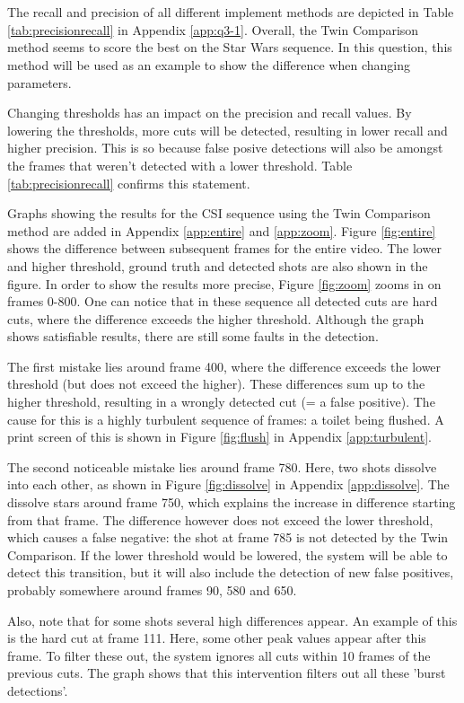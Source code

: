 \section[A comparative discussion of the precision and recall values obtained for each video shot detection method, taking into account different parameter settings.]{}
The recall and precision of all different implement methods are depicted in Table \ref{tab:precisionrecall} in Appendix \ref{app:q3-1}. Overall, the Twin Comparison method seems to score the best on the Star Wars sequence. In this question, this method will be used as an example to show the difference when changing parameters.

Changing thresholds has an impact on the precision and recall values. By lowering the thresholds, more cuts will be detected, resulting in lower recall and higher precision. This is so because false posive detections will also be amongst the frames that weren't detected with a lower threshold. Table \ref{tab:precisionrecall} confirms this statement.
 
Graphs showing the results for the CSI sequence using the Twin Comparison method are added in Appendix \ref{app:entire} and \ref{app:zoom}. Figure \ref{fig:entire} shows the difference between subsequent frames for the entire video. The lower and higher threshold, ground truth and detected shots are also shown in the figure. In order to show the results more precise, Figure \ref{fig:zoom} zooms in on frames 0-800. One can notice that in these sequence all detected cuts are hard cuts, where the difference exceeds the higher threshold. Although the graph shows satisfiable results, there are still some faults in the detection.
 
The first mistake lies around frame 400, where the difference exceeds the lower threshold (but does not exceed the higher). These differences sum up to the higher threshold, resulting in a wrongly detected cut (= a false positive). The cause for this is a highly turbulent sequence of frames: a toilet being flushed. A print screen of this is shown in Figure \ref{fig:flush} in Appendix \ref{app:turbulent}.

The second noticeable mistake lies around frame 780. Here, two shots dissolve into each other, as shown in Figure \ref{fig:dissolve} in Appendix \ref{app:dissolve}. The dissolve stars around frame 750, which explains the increase in difference starting from that frame. The difference however does not exceed the lower threshold, which causes a false negative: the shot at frame 785 is not detected by the Twin Comparison. If the lower threshold would be lowered, the system will be able to detect this transition, but it will also include the detection of new false positives, probably somewhere around frames 90, 580 and 650.

Also, note that for some shots several high differences appear. An example of this is the hard cut at frame 111. Here, some other peak values appear after this frame. To filter these out, the system ignores all cuts within 10 frames of the previous cuts. The graph shows that this intervention filters out all these 'burst detections'.
\\